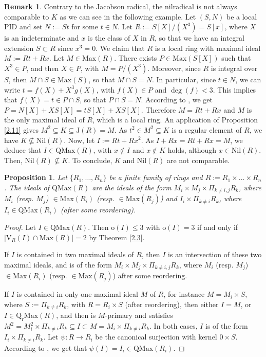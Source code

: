 \documentclass[12pt,leqno]{amsart}
\newtheorem{proposition}[theorem]{Proposition}
\theoremstyle{definition}
\newtheorem{remark}[theorem]{Remark}
\begin{document}
\begin{remark}\label{2.13} Contrary to the Jacobson radical, the nilradical is not always comparable to $K$ as we can see in the following example. Let $(S,N)$ be a local PID and set $N:=St$ for some $t\in N$. Let $R:=S [X]/(X^3)=S[x]$, where $X$ is an indeterminate and $x$ is the class of $X$ in $R$, so that we have an integral extension $S\subset R$ since $x^3=0$.   We claim that $R$ is a local ring with maximal ideal $M:=Rt+Rx$. Let $M\in\mathrm{Max}(R)$. There exists $P\in\mathrm{Max}(S[X])$ such that $ X^3\in P$, and then $X\in P$, with $M=P/(X^3)$. Moreover, since $R$ is integral over $S$, then $M\cap S\in\mathrm{Max}(S)$, so that $M\cap S=N$. In particular, since $t\in N$, we can write $t=f(X)+X^3g(X)$, with $f(X)\in P$ and $\deg(f)<3$. This implies that $f(X)=t\in P\cap S$, so that $P\cap S =N$. According to \cite[Theorem 6.9]{Pic 17}, we get $P=N[X]+XS[X]=tS[X] +XS[X]$. Therefore $M=Rt+Rx$ and $M$ is the only maximal ideal of $R$, which is a local ring. An application of Proposition \ref{2.11} gives $M^2 \subseteq K\subseteq\mathrm J(R)=M$. As $t^2\in M^2\subseteq K$ is a regular element of $R$, we have $K\not\subseteq\mathrm{Nil}(R)$. Now, let $I:=Rt+Rx^2$. As $I+Rx=Rt+Rx=M$, we deduce that $I\in\mathrm {QMax}(R)$, with $x\not\in I$ and $x\not\in K$ holds, although $x\in\mathrm{Nil}(R)$. Then, $\mathrm{Nil}(R)\not\subseteq K$. To conclude, $K$ and $\mathrm{Nil}(R)$ are not comparable.
\end{remark}

\begin{proposition}\label{2.14} Let $\{R_1,\ldots,R_n\}$ be a finite family of rings and $R:=R_1\times\ldots\times R_n$. The ideals of $\mathrm{QMax}(R)$ are the ideals of the form $M_i\times M_j\times\Pi_{k\neq i,j}R_k$, where $M_i$ (resp. $M_j$) $\in\mathrm{Max}(R_i)$ (resp. $\in\mathrm {Max}(R_j)$) and $I_i\times\Pi_{k\neq i}R_k$, where $I_i\in\mathrm{QMax}(R_i)$  (after some reordering).
\end{proposition}
\begin{proof} Let $I\in\mathrm{QMax}(R)$. Then $\mathrm o(I)\leq 3$ with $\mathrm o(I)=3$ if and only if $|\mathrm{V}_R(I)\cap\mathrm{Max}(R)|= 2$ by Theorem \ref{2.3}. 

If $I$ is contained in two maximal ideals of $R$, then $I$ is an intersection of these two maximal ideals, and is of the form $M_i\times M_j\times\Pi_{k\neq i,j}R_k$, where $M_i$ (resp. $M_j$) $\in\mathrm{Max}(R_i)$ (resp. $\in\mathrm {Max}(R_j)$) after some reordering. 

If $I$ is contained in only one maximal ideal $M$ of $R$, for instance $M= M_i\times S$, where $S:=\Pi_{k\neq i}R_k$, with $R=R_i\times S$ (after reordering), then either $I=M$, or $I\in\mathrm{Q_rMax}(R)$, and then is $ M$-primary and satisfies $M^2=M_i^2\times\Pi_{k\neq i}R_k\subseteq I\subset M=M_i\times\Pi_{k\neq i}R_k$. In both cases, $I$ is of the form $ I_i\times\Pi_{k\neq i}R_k$. Let $\psi:R\to R_i$ be the canonical surjection with kernel $0\times S$. According to \cite[Proposition 2]{AKKT}, we get that $\psi(I)= I_i\in\mathrm{QMax}(R_i)$. 
\end{proof}
\end{document}
